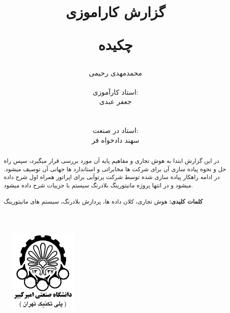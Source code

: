 \documentclass{llncs}
\begin{document}
\title{گزارش کاراموزی}
%
%

\author{محمدمهدی رحیمی \\  \\ استاد کارآموزی: \\ جعفر عبدی \\  \\ \\ استاد در صنعت: \\ سهند دادخواه فر}

\maketitle              %

\begin{figure}[h]
\centering
\includegraphics[width=0.3\textwidth]{mahi/AUT_logo.png}
\centering
\label{fig:robot rendering}
\end{figure}
\newpage
\title{\begin{center}
\begin{normalsize}
\textbf{چکیده} 
\end{normalsize}
\end{center} }
\begin{abstract}
در این گزارش ابتدا به هوش تجاری و مفاهیم پایه آن مورد بررسی قرار میگیرد، سپس راه حل و نحوه پیاده سازی آن برای شرکت ها مخابراتی و استاندارد ها جهانی آن توصیف میشود.
در ادامه راهکار پیاده سازی شده توسط شرکت پرتوآبی برای اپراتور همراه اول شرح داده میشود و در انتها پروژه مانیتورینگ بلادرنگ سیستم با جزییات شرح داده میشود.
\\
\\
\textbf{کلمات کلیدی:} هوش تجاری، کلان داده ها، پردازش بلادرنگ، سیستم های مانیتورینگ

\end{abstract}
\newpage
%
\tableofcontents
\newpage
\listoffigures
\newpage
{}
\end{document}

